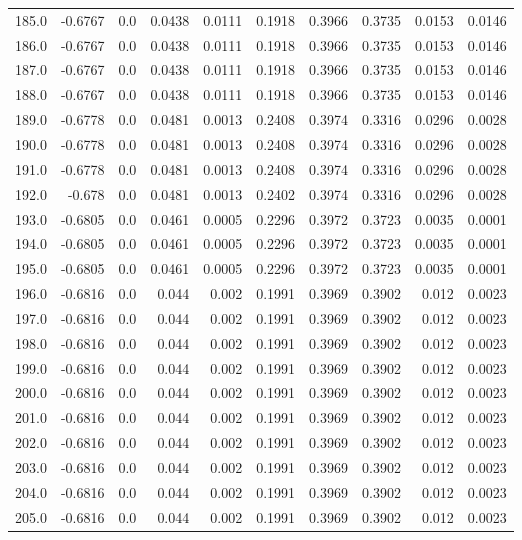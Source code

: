 \begin{longtable}{lrrrrrrrrr}
185.0 & -0.6767 & 0.0 & 0.0438 & 0.0111 & 0.1918 & 0.3966 & 0.3735 & 0.0153 & 0.0146 \\
186.0 & -0.6767 & 0.0 & 0.0438 & 0.0111 & 0.1918 & 0.3966 & 0.3735 & 0.0153 & 0.0146 \\
187.0 & -0.6767 & 0.0 & 0.0438 & 0.0111 & 0.1918 & 0.3966 & 0.3735 & 0.0153 & 0.0146 \\
188.0 & -0.6767 & 0.0 & 0.0438 & 0.0111 & 0.1918 & 0.3966 & 0.3735 & 0.0153 & 0.0146 \\
189.0 & -0.6778 & 0.0 & 0.0481 & 0.0013 & 0.2408 & 0.3974 & 0.3316 & 0.0296 & 0.0028 \\
190.0 & -0.6778 & 0.0 & 0.0481 & 0.0013 & 0.2408 & 0.3974 & 0.3316 & 0.0296 & 0.0028 \\
191.0 & -0.6778 & 0.0 & 0.0481 & 0.0013 & 0.2408 & 0.3974 & 0.3316 & 0.0296 & 0.0028 \\
192.0 & -0.678 & 0.0 & 0.0481 & 0.0013 & 0.2402 & 0.3974 & 0.3316 & 0.0296 & 0.0028 \\
193.0 & -0.6805 & 0.0 & 0.0461 & 0.0005 & 0.2296 & 0.3972 & 0.3723 & 0.0035 & 0.0001 \\
194.0 & -0.6805 & 0.0 & 0.0461 & 0.0005 & 0.2296 & 0.3972 & 0.3723 & 0.0035 & 0.0001 \\
195.0 & -0.6805 & 0.0 & 0.0461 & 0.0005 & 0.2296 & 0.3972 & 0.3723 & 0.0035 & 0.0001 \\
196.0 & -0.6816 & 0.0 & 0.044 & 0.002 & 0.1991 & 0.3969 & 0.3902 & 0.012 & 0.0023 \\
197.0 & -0.6816 & 0.0 & 0.044 & 0.002 & 0.1991 & 0.3969 & 0.3902 & 0.012 & 0.0023 \\
198.0 & -0.6816 & 0.0 & 0.044 & 0.002 & 0.1991 & 0.3969 & 0.3902 & 0.012 & 0.0023 \\
199.0 & -0.6816 & 0.0 & 0.044 & 0.002 & 0.1991 & 0.3969 & 0.3902 & 0.012 & 0.0023 \\
200.0 & -0.6816 & 0.0 & 0.044 & 0.002 & 0.1991 & 0.3969 & 0.3902 & 0.012 & 0.0023 \\
201.0 & -0.6816 & 0.0 & 0.044 & 0.002 & 0.1991 & 0.3969 & 0.3902 & 0.012 & 0.0023 \\
202.0 & -0.6816 & 0.0 & 0.044 & 0.002 & 0.1991 & 0.3969 & 0.3902 & 0.012 & 0.0023 \\
203.0 & -0.6816 & 0.0 & 0.044 & 0.002 & 0.1991 & 0.3969 & 0.3902 & 0.012 & 0.0023 \\
204.0 & -0.6816 & 0.0 & 0.044 & 0.002 & 0.1991 & 0.3969 & 0.3902 & 0.012 & 0.0023 \\
205.0 & -0.6816 & 0.0 & 0.044 & 0.002 & 0.1991 & 0.3969 & 0.3902 & 0.012 & 0.0023 \\

\end{longtable}
